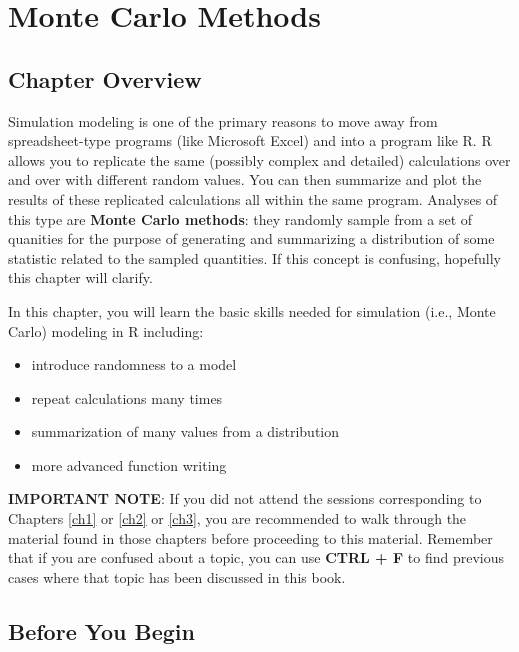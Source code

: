 \documentclass[]{book}
\providecommand{\tightlist}{%
  \setlength{\itemsep}{0pt}\setlength{\parskip}{0pt}}
\theoremstyle{definition}
\theoremstyle{definition}
\theoremstyle{definition}
\theoremstyle{remark}
\begin{document}
\chapter{Monte Carlo Methods}\label{ch4}

\section*{Chapter Overview}\label{chapter-overview-3}

Simulation modeling is one of the primary reasons to move away from
spreadsheet-type programs (like Microsoft Excel) and into a program like
R. R allows you to replicate the same (possibly complex and detailed)
calculations over and over with different random values. You can then
summarize and plot the results of these replicated calculations all
within the same program. Analyses of this type are \textbf{Monte Carlo
methods}: they randomly sample from a set of quanities for the purpose
of generating and summarizing a distribution of some statistic related
to the sampled quantities. If this concept is confusing, hopefully this
chapter will clarify.

In this chapter, you will learn the basic skills needed for simulation
(i.e., Monte Carlo) modeling in R including:

\begin{itemize}
\tightlist
\item
  introduce randomness to a model
\item
  repeat calculations many times
\item
  summarization of many values from a distribution
\item
  more advanced function writing
\end{itemize}

\textbf{IMPORTANT NOTE}: If you did not attend the sessions
corresponding to Chapters \ref{ch1} or \ref{ch2} or \ref{ch3}, you are
recommended to walk through the material found in those chapters before
proceeding to this material. Remember that if you are confused about a
topic, you can use \textbf{CTRL + F} to find previous cases where that
topic has been discussed in this book.

\section*{Before You Begin}\label{before-you-begin-2}
\end{document}
